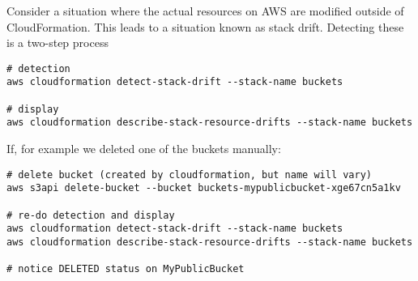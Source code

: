 \documentclass[slides]{pgnotes}
\begin{document}
Consider a situation where the actual resources on AWS are modified
outside of CloudFormation. This leads to a situation known as stack
drift. Detecting these is a two-step process

\begin{verbatim}
# detection 
aws cloudformation detect-stack-drift --stack-name buckets

# display
aws cloudformation describe-stack-resource-drifts --stack-name buckets
\end{verbatim}

If, for example we deleted one of the buckets manually:

\begin{verbatim}
# delete bucket (created by cloudformation, but name will vary)
aws s3api delete-bucket --bucket buckets-mypublicbucket-xge67cn5a1kv

# re-do detection and display
aws cloudformation detect-stack-drift --stack-name buckets
aws cloudformation describe-stack-resource-drifts --stack-name buckets

# notice DELETED status on MyPublicBucket
\end{verbatim}
\end{document}
